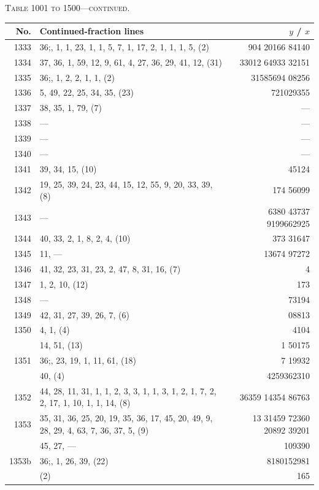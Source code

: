 \documentclass[11pt]{article}
\newcommand{\peheading}{%
  \begin{center}\small\textsc{Table 1001 to 1500---continued.}\end{center}
}
\begin{document}
\peheading
\renewcommand{\arraystretch}{1.15}
{\footnotesize
\begin{longtable}{|r|p{8.5cm}|r|}
\hline
\textbf{No.} & \textbf{Continued-fraction lines} & \textbf{$y$ \;/\; $x$}\\
\hline\endhead
1333   & $36$;\; 1, 1, 1, 23, 1, 1, 5, 7, 1, 17, 2, 1, 1, 1, 5, (2) & 904 20166 84140 \\
1334   & 37, 36, 1, 59, 12, 9, 61, 4, 27, 36, 29, 41, 12, (31) & 33012 64933 32151 \\
\hline
1335   & $36$;\; 13, 1, 2, 2, 1, 1, (2) & 31585694 08256 \\
1336   & 5, 49, 22, 25, 34, 35, (23) & 721029355 \\
1337   & 38, 35, 1, 79, (7) & --- \\
1338   & --- & --- \\
1339   & --- & --- \\
1340   & --- & --- \\
1341   & 39, 34, 15, (10) & 45124 \\
\hline
1342   & 19, 25, 39, 24, 23, 44, 15, 12, 55, 9, 20, 33, 39, (8) & 174 56099 \\
1343   & --- & 6380 43737 9199662925 \\
1344   & 40, 33, 2, 1, 8, 2, 4, (10) & 373 31647 \\
1345   & 11, --- & 13674 97272 \\
\hline
1346   & 41, 32, 23, 31, 23, 2, 47, 8, 31, 16, (7) & 4 \\
1347   & 1, 2, 10, (12) & 173 \\
1348   & --- & 73194 \\
1349   & 42, 31, 27, 39, 26, 7, (6) & 08813 \\
\hline
1350   & 4, 1, (4) & 4104 \\
       & 14, 51, (13) & 1 50175 \\
\hline
1351   & $36$;\; 43, 23, 19, 1, 11, 61, (18) & 7 19932 \\
       & 40, (4) & 4259362310 \\
\hline
1352   & 44, 28, 11, 31, 1, 1, 2, 3, 3, 1, 1, 3, 1, 2, 1, 7, 2, 2, 17, 1, 10, 1, 1, 14, (8) & 36359 14354 86763 \\
1353   & 35, 31, 36, 25, 20, 19, 35, 36, 17, 45, 20, 49, 9, 28, 29, 4, 63, 7, 36, 37, 5, (9) & 13 31459 72360 20892 39201 \\
       & 45, 27, --- & 109390 \\
\hline
1353b  & $36$;\; 46, 1, 26, 39, (22) & 8180152981 \\
       & (2) & 165 \\

\end{longtable}}
\end{document}
